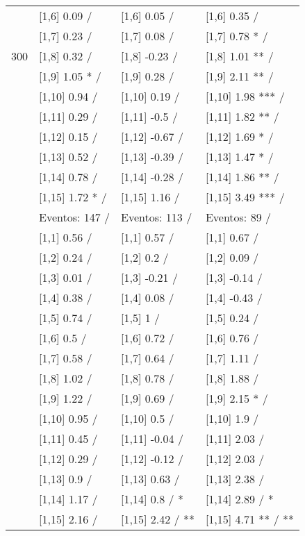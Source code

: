 \begin{table}
\begin{tabular}[t]{llll}
 & {}[1,6] 0.09  / & {}[1,6] 0.05  / & {}[1,6] 0.35  /\\
 & {}[1,7] 0.23  / & {}[1,7] 0.08  / & {}[1,7] 0.78 * /\\
300 & {}[1,8] 0.32  / & {}[1,8] -0.23  / & {}[1,8] 1.01 ** /\\
\addlinespace
 & {}[1,9] 1.05 * / & {}[1,9] 0.28  / & {}[1,9] 2.11 ** /\\
 & {}[1,10] 0.94  / & {}[1,10] 0.19  / & {}[1,10] 1.98 *** /\\
 & {}[1,11] 0.29  / & {}[1,11] -0.5  / & {}[1,11] 1.82 ** /\\
 & {}[1,12] 0.15  / & {}[1,12] -0.67  / & {}[1,12] 1.69 * /\\
 & {}[1,13] 0.52  / & {}[1,13] -0.39  / & {}[1,13] 1.47 * /\\
\addlinespace
 & {}[1,14] 0.78  / & {}[1,14] -0.28  / & {}[1,14] 1.86 ** /\\
 & {}[1,15] 1.72 * / & {}[1,15] 1.16  / & {}[1,15] 3.49 *** /\\
 & Eventos:  147 / & Eventos:  113 / & Eventos:  89 /\\
 & {}[1,1] 0.56  / & {}[1,1] 0.57  / & {}[1,1] 0.67  /\\
 & {}[1,2] 0.24  / & {}[1,2] 0.2  / & {}[1,2] 0.09  /\\
\addlinespace
 & {}[1,3] 0.01  / & {}[1,3] -0.21  / & {}[1,3] -0.14  /\\
 & {}[1,4] 0.38  / & {}[1,4] 0.08  / & {}[1,4] -0.43  /\\
 & {}[1,5] 0.74  / & {}[1,5] 1  / & {}[1,5] 0.24  /\\
 & {}[1,6] 0.5  / & {}[1,6] 0.72  / & {}[1,6] 0.76  /\\
 & {}[1,7] 0.58  / & {}[1,7] 0.64  / & {}[1,7] 1.11  /\\
\addlinespace
500 & {}[1,8] 1.02  / & {}[1,8] 0.78  / & {}[1,8] 1.88  /\\
 & {}[1,9] 1.22  / & {}[1,9] 0.69  / & {}[1,9] 2.15 * /\\
 & {}[1,10] 0.95  / & {}[1,10] 0.5  / & {}[1,10] 1.9  /\\
 & {}[1,11] 0.45  / & {}[1,11] -0.04  / & {}[1,11] 2.03  /\\
 & {}[1,12] 0.29  / & {}[1,12] -0.12  / & {}[1,12] 2.03  /\\
\addlinespace
 & {}[1,13] 0.9  / & {}[1,13] 0.63  / & {}[1,13] 2.38  /\\
 & {}[1,14] 1.17  / & {}[1,14] 0.8  / * & {}[1,14] 2.89  / *\\
 & {}[1,15] 2.16  / & {}[1,15] 2.42  / ** & {}[1,15] 4.71 ** / **\\
\bottomrule
\end{tabular}
\end{table}
